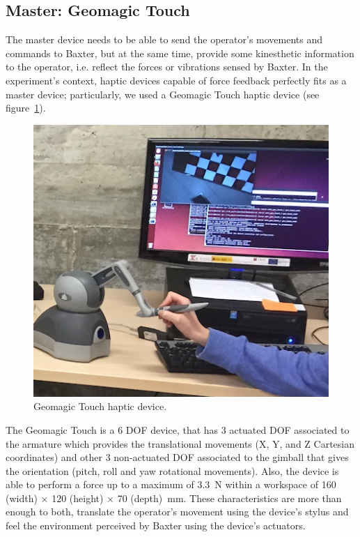 \documentclass[journal,twoside]{JoPhA}
\begin{document}
  \subsection{Master: Geomagic Touch}
  \label{sec:environment:master}


  The master device needs to be able to send the operator's movements and commands to Baxter, but at the same time, provide some kinesthetic information to the operator, i.e. reflect the forces or vibrations sensed by Baxter. In the experiment's context, haptic devices capable of force feedback perfectly fits as a master device; particularly, we used a Geomagic Touch haptic device (see figure~\ref{fig:environment:master}).
    
\begin{figure}[!ht]
  \centering
  \includegraphics[scale=0.5]{Images/BaxterYHapticSmall.jpg}
  
  \caption{Geomagic Touch haptic device.}
  \label{fig:environment:master}
\end{figure}

  The Geomagic Touch is a 6 DOF device, that has 3 actuated DOF associated to the armature which provides the translational movements (X, Y, and Z Cartesian coordinates) and other 3 non-actuated DOF associated to the gimball that gives the orientation (pitch, roll and yaw rotational movements). Also, the device is able to perform a force up to a maximum of 3.3~N within a workspace of 160 (width) $\times$ 120 (height) $\times$ 70 (depth)~mm. These characteristics are more than enough to both, translate the operator's movement using the device's stylus and feel the environment perceived by Baxter using the device's actuators.
  
\end{document}
